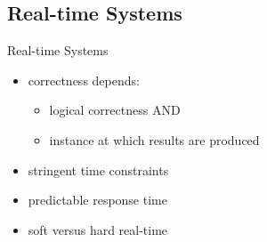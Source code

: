\documentclass[10pt,hyperref={hyperfootnotes=false}, xcolor={usenames, dvipsnames}]{beamer}
\begin{document}
\subsection{Real-time Systems}
\begin{frame}{Real-time Systems}
  \begin{itemize}
  \item {correctness depends:\pause{}
			\begin{itemize}
        	   \item {logical correctness}  \pause{}  AND
			   \item {instance at which results are produced}  \pause{} 
	        \end{itemize}
		}
  \item {stringent time constraints} \pause{}
  	\begingroup
	
	\endgroup
    \pause{}
  \item {predictable response time} \pause{}
  \item {soft versus hard real-time}
  \end{itemize}
\end{frame}

\end{document}
